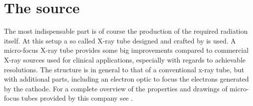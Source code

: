 \section{The source} \label{sec:source}
The most indispensable part is of course the production of the required radiation itself. At this setup a so called  X-ray tube designed and crafted by  is used. A micro-focus X-ray tube provides some big improvements compared to commercial X-ray sources used for clinical applications, especially with regards to achievable resolutions. The structure is in general to that of a conventional x-ray tube, but with additional parts, including an electron optic to focus the electrons generated by the cathode. For a complete overview of the properties and drawings of micro-focus tubes provided by this company see \citep{DatasheetX,Datashort,CAD,X-COMsoft}.   
